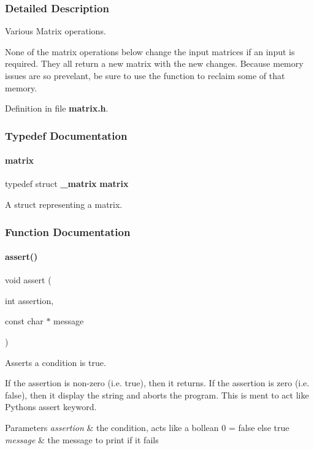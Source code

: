 \subsubsection{Detailed Description}
Various Matrix operations. 

None of the matrix operations below change the input matrices if an input is required. They all return a new matrix with the new changes. Because memory issues are so prevelant, be sure to use the  function to reclaim some of that memory. 

Definition in file \textbf{ matrix.\+h}.



\subsubsection{Typedef Documentation}
\mbox{\label{matrix_8h_abc75382643898dd572498a574bf891c7}} 
\paragraph{matrix}
{\footnotesize\ttfamily typedef struct \textbf{ \+\_\+matrix}  \textbf{ matrix}}



A struct representing a matrix. 



\subsubsection{Function Documentation}
\mbox{\label{matrix_8h_a8e41e30382335ea89f90b72db0b44d6f}} 
\paragraph{assert()}
{\footnotesize\ttfamily void assert (\begin{DoxyParamCaption}\item[{int}]{assertion,  }\item[{const char $\ast$}]{message }\end{DoxyParamCaption})}



Asserts a condition is true. 

If the assertion is non-\/zero (i.\+e. true), then it returns. If the assertion is zero (i.\+e. false), then it display the string and aborts the program. This is ment to act like Python\textquotesingle{}s assert keyword. 
\begin{DoxyParams}{Parameters}
{\em assertion} & the condition, acts like a bollean 0 = false else true \\
\hline
{\em message} & the message to print if it fails \\
\hline
\end{DoxyParams}


